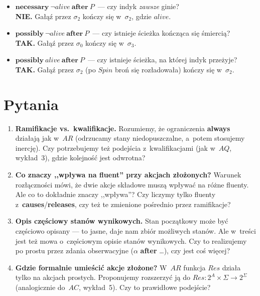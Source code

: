 \documentclass[11pt,a4paper]{article}
\newcommand{\causes}{\textbf{causes}}
\newcommand{\aft}{\textbf{after}}
\newcommand{\always}{\textbf{always}}
\newcommand{\releases}{\textbf{releases}}
\newcommand{\necessary}{\textbf{necessary}}
\newcommand{\possibly}{\textbf{possibly}}
\begin{document}
\begin{itemize}
  \item $\necessary\ \neg\mathit{alive}\ \aft\ P$~---
    czy indyk \emph{zawsze} ginie?\\
    \textbf{NIE.} Gałąź przez $\sigma_2$ kończy się w~$\sigma_2$, gdzie $\mathit{alive}$.

  \item $\possibly\ \neg\mathit{alive}\ \aft\ P$~---
    czy istnieje ścieżka kończąca się śmiercią?\\
    \textbf{TAK.} Gałąź przez $\sigma_0$ kończy się w~$\sigma_3$.

  \item $\possibly\ \mathit{alive}\ \aft\ P$~---
    czy istnieje ścieżka, na której indyk przeżyje?\\
    \textbf{TAK.} Gałąź przez $\sigma_2$ (po $\mathit{Spin}$ broń się rozładowała)
    kończy się w~$\sigma_2$.
\end{itemize}

\section{Pytania }

\begin{enumerate}
  \item \textbf{Ramifikacje vs.\ kwalifikacje.}
    Rozumiemy, że ograniczenia \always{} działają jak w~$AR$
    (odrzucamy stany niedopuszczalne, a~potem stosujemy inercję).
    Czy potrzebujemy też podejścia z~kwalifikacjami (jak w~$AQ$, wykład~3),
    gdzie kolejność jest odwrotna?

  \item \textbf{Co znaczy ,,wpływa na fluent'' przy akcjach złożonych?}
    Warunek rozłączności mówi, że dwie akcje składowe muszą wpływać
    na różne fluenty. Ale co to dokładnie znaczy ,,wpływa''?
    Czy liczymy tylko fluenty z~\causes{}/\releases{},
    czy też te zmienione pośrednio przez ramifikacje?

  \item \textbf{Opis częściowy stanów wynikowych.}
    Stan początkowy może być częściowo opisany --- to jasne, daje nam
    zbiór możliwych stanów. Ale w~treści jest też mowa o~częściowym opisie
    stanów wynikowych. Czy to realizujemy po prostu przez zdania
    obserwacyjne ($\alpha$ \aft{} \ldots), czy jest coś więcej?

  \item \textbf{Gdzie formalnie umieścić akcje złożone?}
    W~$AR$ funkcja $\mathit{Res}$ działa tylko na akcjach prostych.
    Proponujemy rozszerzyć ją do
    $\mathit{Res}\colon 2^A \times \Sigma \to 2^\Sigma$
    (analogicznie do~$AC$, wykład~5).
    Czy to prawidłowe podejście?
\end{enumerate}
\end{document}
